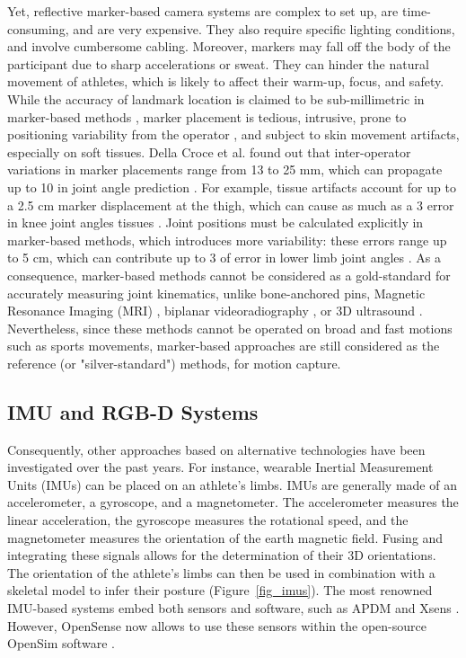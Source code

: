 Yet, reflective marker-based camera systems are complex to set up, are time-consuming, and are very expensive. They also require specific lighting conditions, and involve cumbersome cabling. Moreover, markers may fall off the body of the participant due to sharp accelerations or sweat. They can hinder the natural movement of athletes, which is likely to affect their warm-up, focus, and safety. While the accuracy of landmark location is claimed to be sub-millimetric in marker-based methods \cite{Topley2020}, marker placement is tedious, intrusive, prone to positioning variability from the operator \cite{Tsushima2003}, and subject to skin movement artifacts, especially on soft tissues. Della Croce et al. found out that inter-operator variations in marker placements range from 13 to 25 mm, which can propagate up to 10\degree{} in joint angle prediction \cite{Gorton2009,Croce1999}. For example, tissue artifacts account for up to a 2.5 cm marker displacement at the thigh, which can cause as much as a 3\degree{} error in knee joint angles tissues \cite{Benoit2015,Cappozzo1995}. Joint positions must be calculated explicitly in marker-based methods, which introduces more variability: these errors range up to 5 cm, which can contribute up to 3\degree{} of error in lower limb joint angles \cite{Leboeuf2019a}. As a consequence, marker-based methods cannot be considered as a gold-standard for accurately measuring joint kinematics, unlike bone-anchored pins, Magnetic Resonance Imaging (MRI) \cite{Yahia2004}, biplanar videoradiography \cite{Miranda2013, Kessler2019}, or 3D ultrasound \cite{Peters2010}. Nevertheless, since these methods cannot be operated on broad and fast motions such as sports movements, marker-based approaches are still considered as the reference (or "silver-standard") methods, for motion capture.


\FloatBarrier
\subsection{IMU and RGB-D Systems}

Consequently, other approaches based on alternative technologies have been investigated over the past years. For instance, wearable Inertial Measurement Units (IMUs) can be placed on an athlete's limbs. IMUs are generally made of an accelerometer, a gyroscope, and a magnetometer. The accelerometer measures the linear acceleration, the gyroscope measures the rotational speed, and the magnetometer measures the orientation of the earth magnetic field. Fusing and integrating these signals allows for the determination of their 3D orientations. The orientation of the athlete's limbs can then be used in combination with a skeletal model to infer their posture (Figure~\ref{fig_imus}). The most renowned IMU-based systems embed both sensors and software, such as APDM \cite{APDM} and Xsens \cite{Xsens}. However, OpenSense now allows to use these sensors within the open-source OpenSim software \cite{Borno2022}.


